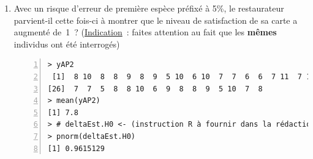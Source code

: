 \documentclass[10pt]{report}
\begin{document}
\begin{exercice}
\begin{enumerate}
 


Dans l'expectative, le restaurateur d{\'e}cide d'interroger les 40 clients qui s'{\'e}taient d{\'e}j{\`a} prononc{\'e}s sur la premi{\`e}re carte, pensant qu'ils seraient plus {\`a} m{\^e}me de juger la nouvelle carte. Il reprend contact avec ces 40 clients et les invitent {\`a} se prononcer sur sa nouvelle carte. On stocke les notes associ{\'e}es {\`a} la nouvelle carte dans le vecteur \texttt{yAP2} (voir fin exercice). 

\item Avec un risque d'erreur de premi{\`e}re esp{\`e}ce pr{\'e}fix{\'e} {\`a} 5\%, le restaurateur parvient-il cette fois-ci {\`a} montrer que le niveau de satisfaction de sa carte a augment{\'e} de~1~? (\underline{Indication}~: faites attention au fait que les \textbf{m{\^e}mes} individus ont {\'e}t{\'e} interrog{\'e}s)

\IndicR
\begin{Verbatim}[frame=leftline,fontfamily=tt,fontshape=n,numbers=left]
> yAP2
 [1]  8 10  8  8  9  8  9  5 10  6 10  7  7  6  6  7 11  7 12  6  7  7 10  6  7
[26]  7  7  5  8  8 10  6  9  8  8  9  5 10  7  8
> mean(yAP2)
[1] 7.8
> # deltaEst.H0 <- (instruction R à fournir dans la rédaction)
> pnorm(deltaEst.H0)
[1] 0.9615129
\end{Verbatim}

 


\end{enumerate}
 
\end{exercice}
\end{document}
